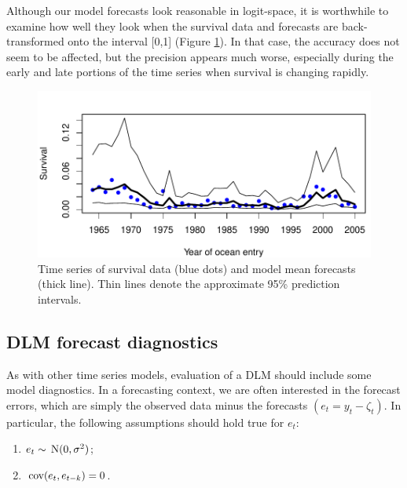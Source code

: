 \documentclass[10pt]{article}
\def\cov{\,\textup{\textrm{cov}}}
\def\N{\,\textup{\textrm{N}}}
\begin{document}
Although our model forecasts look reasonable in logit-space, it is worthwhile to examine how well they look when the survival data and forecasts are back-transformed onto the interval [0,1] (Figure \ref{fig:CSX.fig4}). In that case, the accuracy does not seem to be affected, but the precision appears much worse, especially during the early and late portions of the time series when survival is changing rapidly.
\begin{figure}[htp]
\begin{center}
\includegraphics{DLM_lab_5-plotdlmForeRaw}
\end{center}
\caption{Time series of survival data (blue dots) and model mean forecasts (thick line). Thin lines denote the approximate 95\% prediction intervals.}
\label{fig:CSX.fig4}
\end{figure}
\subsection{DLM forecast diagnostics}
\begin{samepage}
As with other time series models, evaluation of a DLM should include some model diagnostics. In a forecasting context, we are often interested in the forecast errors, which are simply the observed data minus the forecasts $(e_t = y_t - \zeta_t)$. In particular, the following assumptions should hold true for $e_t$:
\begin{enumerate}[1)]
\item $e_t \sim \N(0,\sigma^2)$;
\item $\cov(e_t,e_{t-k}) = 0$.
\end{enumerate}
\end{samepage}
\end{document}
